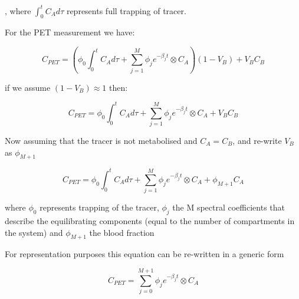 , where $\int_{0}^{t}C_A  d\tau$ represents full trapping of tracer.

For the PET measurement we have: 

\begin{equation} \label{EqRE}
C_{PET} = ( \phi_0  \int_{0}^{t}C_A  d\tau + \sum_{j=1}^{M} \phi_j e^{-\beta_j t} \otimes C_A  )(1-V_B) + V_B C_B
\end{equation}

\newline
if we assume  $(1-V_B)\approx1$ then:

\begin{equation} \label{EqRE}
C_{PET} = \phi_0\int_{0}^{t}C_Ad\tau  + \sum_{j=1}^{M} \phi_j e^{-\beta_j t} \otimes C_A  + V_B C_B
\end{equation}

Now assuming that the tracer is not metabolised and $C_A = C_B$, and re-write $V_B$ as $\phi_{M+1}$

\begin{equation} \label{EqRE}
C_{PET} = \phi_0\int_{0}^{t}C_Ad\tau  + \sum_{j=1}^{M} \phi_j e^{-\beta_j t} \otimes C_A  + \phi_{M+1} C_A
\end{equation}

\newline where $\phi_0$ represents trapping of the tracer, $\phi_j$ the M spectral coefficients that describe the equilibrating components (equal to the number of compartments in the system) and $\phi_{M+1}$ the blood fraction

For representation purposes this equation can be re-written in a generic form 

\begin{equation} \label{EqRE}
C_{PET} = \sum_{j=0}^{M+1} \phi_j e^{-\beta_j t} \otimes C_A 
\end{equation}
